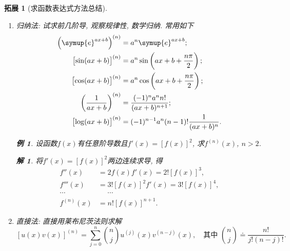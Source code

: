 \documentclass[a4paper, 12pt]{ctexart}
\theoremstyle{plain}
\theoremstyle{nonumberplain}
\newtheorem{solution}{解}
\theoremstyle{nonumberplain}
\newtheorem{supplement}{拓展}
\theoremstyle{nonumberplain}
\newtheorem{example}{例}
\newcommand{\me}{\symup{e}}
\begin{document}
    \begin{supplement}[求函数表达式方法总结]\hspace{\fill}
        \begin{enumerate}[1.]
            \item 归纳法: 试求前几阶导, 观察规律性, 数学归纳. 常用如下
            \begin{equation}
                \begin{aligned}
                    \left(\me^{ax+b}\right)^{(n)}&=a^n\me^{ax+b};\\
                    \left[\sin(ax+b)\right]^{(n)}&=a^n\sin\left(ax+b+\frac{n\pi}{2}\right);\\
                    \left[\cos(ax+b)\right]^{(n)}&=a^n\cos\left(ax+b+\frac{n\pi}{2}\right);\\
                    \left(\frac{1}{ax+b}\right)^{(n)}&=\frac{(-1)^na^nn!}{(ax+b)^{n+1}};\\
                    \left[\log(ax+b)\right]^{(n)}&=(-1)^{n-1}a^n(n-1)!\frac{1}{(ax+b)^n}.
                \end{aligned}
            \end{equation}
            \begin{example}
                设函数$f(x)$有任意阶导数且$f'(x)=\left[f(x)\right]^2$, 求$f^{(n)}(x)$, $n>2$.
            \end{example}
            \begin{solution}
                将$f'(x)=\left[f(x)\right]^2$两边连续求导, 得
                \begin{equation}
                    \begin{aligned}
                        f''(x)&=2f(x)f'(x)=2!\left[f(x)\right]^3,\\
                        f'''(x)&=3!\left[f(x)\right]^2f'(x)=3!\left[f(x)\right]^4,\\
                        \dotsb&\phantom{{}={}}\dotsb\\
                        f^{(n)}(x)&=n!\left[f(x)\right]^{n+1}.
                    \end{aligned}
                \end{equation}
            \end{solution}
            \item 直接法: 直接用莱布尼茨法则求解
            \begin{equation}
                \left[u(x)v(x)\right]^{(n)}=\sum_{j=0}^{n}\binom{n}{j}u^{(j)}(x)v^{(n-j)}(x), \quad\text{其中 }\binom{n}{j}\doteq\frac{n!}{j!(n-j)!}.

\end{equation}
\end{enumerate}
\end{supplement}
\end{document}
